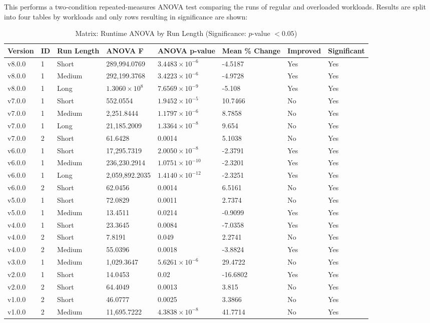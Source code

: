 This performs a two-condition repeated-measures ANOVA test comparing the runs of regular and overloaded workloads. Results are split into four tables by workloads and only rows resulting in significance are shown:

\begin{table}[H]\caption{Matrix: Runtime ANOVA by Run Length (Significance: $p$-value $<0.05$)}
\centering\footnotesize\setlength{\tabcolsep}{4pt}\renewcommand{\arraystretch}{1.15}
\begin{tabular}{llllllll}
\toprule
Version & ID & Run Length & ANOVA F & ANOVA p-value & Mean \% Change & Improved & Significant \\ \midrule
v8.0.0 & 1 & Short & 289,994.0769 & $3.4483\times10^{-6}$ & -4.5187 & Yes & Yes \\
v8.0.0 & 1 & Medium & 292,199.3768 & $3.4223\times10^{-6}$ & -4.9728 & Yes & Yes \\
v8.0.0 & 1 & Long & $1.3060\times10^{8}$ & $7.6569\times10^{-9}$ & -5.108 & Yes & Yes \\
v7.0.0 & 1 & Short & 552.0554 & $1.9452\times10^{-5}$ & 10.7466 & No & Yes \\
v7.0.0 & 1 & Medium & 2,251.8444 & $1.1797\times10^{-6}$ & 8.7858 & No & Yes \\
v7.0.0 & 1 & Long & 21,185.2009 & $1.3364\times10^{-8}$ & 9.654 & No & Yes \\
v7.0.0 & 2 & Short & 61.6428 & 0.0014 & 5.1038 & No & Yes \\
v6.0.0 & 1 & Short & 17,295.7319 & $2.0050\times10^{-8}$ & -2.3791 & Yes & Yes \\
v6.0.0 & 1 & Medium & 236,230.2914 & $1.0751\times10^{-10}$ & -2.3201 & Yes & Yes \\
v6.0.0 & 1 & Long & 2,059,892.2035 & $1.4140\times10^{-12}$ & -2.3251 & Yes & Yes \\
v6.0.0 & 2 & Short & 62.0456 & 0.0014 & 6.5161 & No & Yes \\
v5.0.0 & 1 & Short & 72.0829 & 0.0011 & 2.7374 & No & Yes \\
v5.0.0 & 1 & Medium & 13.4511 & 0.0214 & -0.9099 & Yes & Yes \\
v4.0.0 & 1 & Short & 23.3645 & 0.0084 & -7.0358 & Yes & Yes \\
v4.0.0 & 2 & Short & 7.8191 & 0.049 & 2.2741 & No & Yes \\
v4.0.0 & 2 & Medium & 55.0396 & 0.0018 & -3.8824 & Yes & Yes \\
v3.0.0 & 1 & Medium & 1,029.3647 & $5.6261\times10^{-6}$ & 29.4722 & No & Yes \\
v2.0.0 & 1 & Short & 14.0453 & 0.02 & -16.6802 & Yes & Yes \\
v2.0.0 & 2 & Short & 64.4049 & 0.0013 & 3.815 & No & Yes \\
v1.0.0 & 2 & Short & 46.0777 & 0.0025 & 3.3866 & No & Yes \\
v1.0.0 & 2 & Medium & 11,695.7222 & $4.3838\times10^{-8}$ & 41.7714 & No & Yes \\
\bottomrule\end{tabular}
\par\smallskip\parbox{0.95\textwidth}{\scriptsize}
\end{table}

